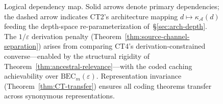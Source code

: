 \documentclass[journal]{IEEEtran}
\numberwithin{equation}{section}
\begin{document}
\begin{figure}[ht]
{
}%
\caption{Logical dependency map.
Solid arrows denote primary dependencies; the dashed arrow indicates
CT2's architecture mapping $d\mapsto\kappa_{\mathcal A}(d)$ feeding
the depth-space re-parameterization of~\S\ref{sec:arch-depth}.
The $1/\varepsilon$ derivation penalty
(Theorem~\ref{thm:source-channel-separation}) arises from comparing
CT4's derivation-constrained converse---enabled by the structural
rigidity of Theorem~\ref{thm:ancestral-relevance}---with the coded
caching achievability over $\mathrm{BEC}_m(\varepsilon)$.
Representation invariance (Theorem~\ref{thm:CT-transfer}) ensures
all coding theorems transfer across synonymous representations.}
\label{fig:roadmap}
\end{figure}
\end{document}
